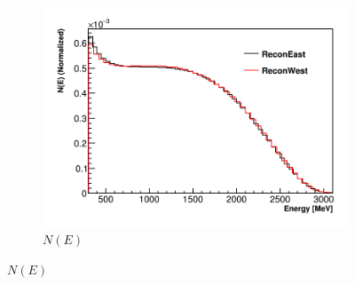 \begin{figure}[]
\centering
    \begin{subfigure}[t]{0.45\textwidth}
        \centering
        \includegraphics[width=\textwidth]{ReconEastvWest_N}
        \caption{$N(E)$}
    \end{subfigure}%


\end{figure}

